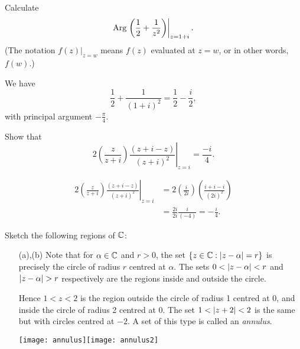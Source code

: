 \begin{questions}
\question Calculate
\[
\mathrm{Arg} \left. \left( \frac{1}{2} + \frac{1}{z^2} \right) \right|_{z=1+i}.
\]
(The notation
$
\left. f(z) \right|_{z=w}
$
means $f(z)$ evaluated at $z=w$, or in other words, $f(w)$.)
\begin{answer}
We have
\[
\frac{1}{2} + \frac{1}{(1+i)^2} = \frac{1}{2}-\frac{i}{2},
\]
with principal argument $-\frac{\pi}{4}$.
\end{answer}
\question Show that
\[
2 \left( \frac{z}{z+i} \right) \left. \frac{(z+i-z)}{(z+i)^2} \right|_{z=i} = \frac{-i}{4}.
\]
\begin{answer}
\begin{align*}
2 \left( \frac{z}{z+i} \right) \left. \frac{(z+i-z)}{(z+i)^2} \right|_{z=i} & = 2 \left( \frac{i}{2i} \right) \left( \frac{i+i-i}{(2i)^2} \right) \\
& = \frac{2i}{2i} \frac{i}{(-4)} = -\frac{i}{4}.
\end{align*}
\end{answer}


\question Sketch the following regions of $\mathbb{C}$:
\begin{answer}

\begin{enumerate}
\item[(a),(b)] Note that for $\alpha \in \mathbb{C}$ and $r>0$, the set $\left\{ z \in \mathbb{C}: \left| z-\alpha \right| = r\right\}$ is precisely the circle of radius $r$ centred at $\alpha$.  The sets $0<\left| z-\alpha \right|<r$ and $\abs{z-\alpha}>r$ respectively are the regions inside and outside the circle.

Hence $1<z<2$ is the region outside the circle of radius 1 centred at 0, and inside the circle of radius 2 centred at 0.  The set $1<\left| z+2 \right|<2$ is the same but with circles centred at $-2$.  A set of this type is called an \emph{annulus}.
\begin{center}
\texttt{[image: annulus]}\quad \texttt{[image: annulus2]}
\end{center}


\end{enumerate}
\end{answer}
\end{questions}
